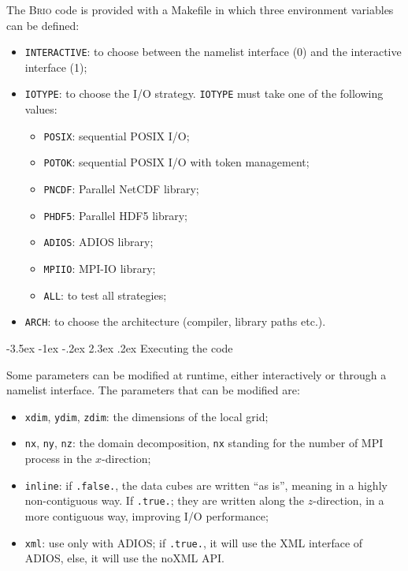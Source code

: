 \documentclass[a4paper,12pt]{article}
\makeatletter
\renewcommand{\section}{\@startsection {section}{1}{\z@}%
             {-3.5ex \@plus -1ex \@minus -.2ex}%
             {2.3ex \@plus .2ex}%
             {\normalfont\Large\sffamily\bfseries}}
\makeatother
\begin{document}
The \textsc{Brio} code is provided with a Makefile in which three environment variables can be defined:
\begin{itemize}
  \item \texttt{INTERACTIVE}: to choose between the namelist interface (0) and the interactive interface (1);
  \item \texttt{IOTYPE}: to choose the I/O strategy. \texttt{IOTYPE} must take one of the following values: 
    \begin{itemize}
      \item \texttt{POSIX}: sequential POSIX I/O; 
      \item \texttt{POTOK}: sequential POSIX I/O with token management; 
      \item \texttt{PNCDF}: Parallel NetCDF library;
      \item \texttt{PHDF5}: Parallel HDF5 library;
      \item \texttt{ADIOS}: ADIOS library;
      \item \texttt{MPIIO}: MPI-IO library;
      \item \texttt{ALL}: to test all strategies;
    \end{itemize}
  \item \texttt{ARCH}: to choose the architecture (compiler, library paths etc.).
\end{itemize}

\section{Executing the code}

Some parameters can be modified at runtime, either interactively or through a namelist interface. The parameters that can be modified are:
\begin{itemize}
  \item \texttt{xdim}, \texttt{ydim}, \texttt{zdim}: the dimensions of the local grid;
  \item \texttt{nx}, \texttt{ny}, \texttt{nz}: the domain decomposition, \texttt{nx} standing for the number of MPI process in the $x$-direction;
  \item \texttt{inline}: if \texttt{.false.}, the data cubes are written ``as is'', meaning in a highly non-contiguous way. If \texttt{.true.}; they are written along the $z$-direction, in a more contiguous way, improving I/O performance;
  \item \texttt{xml}: use only with ADIOS; if \texttt{.true.}, it will use the XML interface of ADIOS, else, it will use the noXML API.
\end{itemize}
\end{document}
